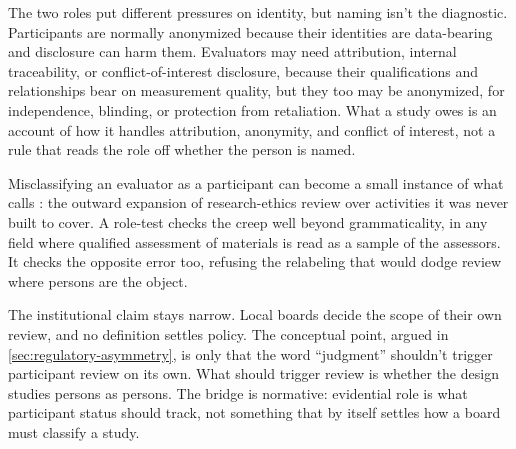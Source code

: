 The two roles put different pressures on identity, but naming isn't the diagnostic. Participants are normally anonymized because their identities are data-bearing and disclosure can harm them. Evaluators may need attribution, internal traceability, or conflict-of-interest disclosure, because their qualifications and relationships bear on measurement quality, but they too may be anonymized, for independence, blinding, or protection from retaliation. What a study owes is an account of how it handles attribution, anonymity, and conflict of interest, not a rule that reads the role off whether the person is named.

Misclassifying an evaluator as a participant can become a small instance of what \textcite{haggerty2004} calls : the outward expansion of research-ethics review over activities it was never built to cover. A role-test checks the creep well beyond grammaticality, in any field where qualified assessment of materials is read as a sample of the assessors. It checks the opposite error too, refusing the relabeling that would dodge review where persons are the object.

The institutional claim stays narrow. Local boards decide the scope of their own review, and no definition settles policy. The conceptual point, argued in \autoref{sec:regulatory-asymmetry}, is only that the word \enquote{judgment} shouldn't trigger participant review on its own. What should trigger review is whether the design studies persons as persons. The bridge is normative: evidential role is what participant status should track, not something that by itself settles how a board must classify a study.
